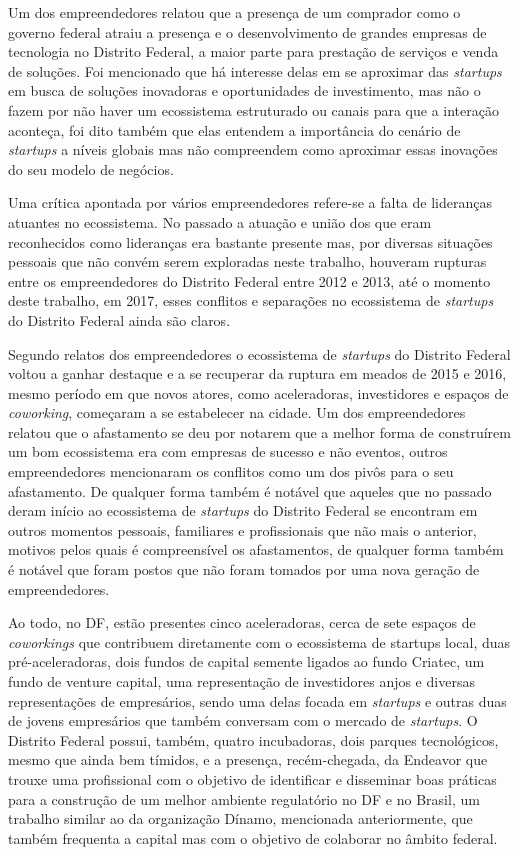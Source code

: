Um dos empreendedores relatou que a presença de um comprador como o governo federal atraiu a presença e o desenvolvimento de grandes empresas de tecnologia no Distrito Federal, a maior parte para prestação de serviços e venda de soluções. Foi mencionado que há interesse delas em se aproximar das \textit{startups} em busca de soluções inovadoras e oportunidades de investimento, mas não o fazem por não haver um ecossistema estruturado ou canais para que a interação aconteça, foi dito também que elas entendem a importância do cenário de \textit{startups} a níveis globais mas não compreendem como aproximar essas inovações do seu modelo de negócios. 

Uma crítica apontada por vários empreendedores refere-se a falta de lideranças atuantes no ecossistema. No passado a atuação e união dos que eram reconhecidos como lideranças era bastante presente mas, por diversas situações pessoais que não convém serem exploradas neste trabalho, houveram rupturas entre os empreendedores do Distrito Federal entre 2012 e 2013, até o momento deste trabalho, em 2017, esses conflitos e separações no ecossistema de \textit{startups} do Distrito Federal ainda são claros. 

Segundo relatos dos empreendedores o ecossistema de \textit{startups} do Distrito Federal voltou a ganhar destaque e a se recuperar da ruptura em meados de 2015 e 2016, mesmo período em que novos atores, como aceleradoras, investidores e espaços de \textit{coworking}, começaram a se estabelecer na cidade. Um dos empreendedores relatou que o afastamento se deu por notarem que a melhor forma de construírem um bom ecossistema era com empresas de sucesso e não eventos, outros empreendedores mencionaram os conflitos como um dos pivôs para o seu afastamento. De qualquer forma também é notável que aqueles que no passado deram início ao ecossistema de \textit{startups} do Distrito Federal se encontram em outros momentos pessoais, familiares e profissionais que não mais o anterior, motivos pelos quais é compreensível os afastamentos, de qualquer forma também é notável que foram postos que não foram tomados por uma nova geração de empreendedores.

Ao todo, no DF, estão presentes cinco aceleradoras, cerca de sete espaços de \textit{coworkings} que contribuem diretamente com o ecossistema de startups local, duas pré-aceleradoras, dois fundos de capital semente ligados ao fundo Criatec, um fundo de venture capital, uma representação de investidores anjos e diversas representações de empresários, sendo uma delas focada em \textit{startups} e outras duas de jovens empresários que também conversam com o mercado de \textit{startups}. O Distrito Federal possui, também, quatro incubadoras, dois parques tecnológicos, mesmo que ainda bem tímidos, e a presença, recém-chegada, da Endeavor que trouxe uma profissional com o objetivo de identificar e disseminar boas práticas para a construção de um melhor ambiente regulatório no DF e no Brasil, um trabalho similar ao da organização Dínamo, mencionada anteriormente, que também frequenta a capital mas com o objetivo de colaborar no âmbito federal.

